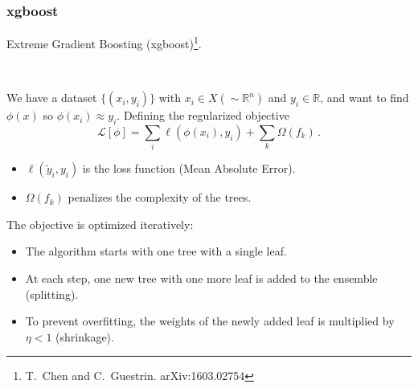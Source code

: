 \documentclass[mathserif, 10pt]{beamer}
\begin{document}
\begin{frame}
    \frametitle{xgboost}

    Extreme Gradient Boosting (xgboost)\footnote[1]{T.~Chen and C.~Guestrin. arXiv:1603.02754}.

    ~

    We have a dataset $\{(x_i, y_i)\}$ with $x_i \in X (\sim\mathbb{R}^n)$ and $y_i \in \mathbb{R}$, and want to find $\phi(x)$ so $\phi(x_i)\approx y_i$. Defining the regularized objective
    $$\mathcal{L}[\phi] = \sum_i \ell(\phi(x_i), y_i) + \sum_k \Omega(f_k)\,. $$
\begin{itemize}
\item $\ell(\tilde{y}_i, y_i)$ is the loss function (Mean Absolute Error).
    \item $\Omega(f_k)$ penalizes the complexity of the trees.
\end{itemize}
The objective is optimized iteratively:
\begin{itemize}
    \item The algorithm starts with one tree with a single leaf.
    \item At each step, one new tree with one more leaf is added to the ensemble (splitting).
    \item To prevent overfitting, the weights of the newly added leaf is multiplied by $\eta < 1$ (shrinkage).
\end{itemize}
\end{frame}
\end{document}
